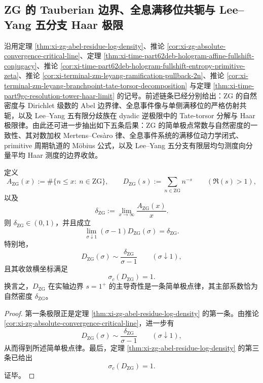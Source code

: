 \subsection{ZG 的 Tauberian 边界、全息满移位共轭与 Lee--Yang 五分支 Haar 极限}\label{subsec:conclusion-zg-hologram-leyang-residue-fullshift-haar}
沿用定理 \ref{thm:xi-zg-abel-residue-log-density}、推论 \ref{cor:xi-zg-absolute-convergence-critical-line}、定理 \ref{thm:xi-time-part62deb-hologram-affine-fullshift-conjugacy}、推论 \ref{cor:xi-time-part62deb-hologram-fullshift-entropy-primitive-zeta}、推论 \ref{cor:xi-terminal-zm-leyang-ramification-pullback-2n}、推论 \ref{cor:xi-terminal-zm-leyang-branchpoint-tate-torsor-decomposition} 与定理 \ref{thm:xi-time-part9gc-resolution-tower-haar-limit} 的记号。前述链条已经分别给出：\(\mathrm{ZG}\) 的自然密度与 Dirichlet 级数的 Abel 边界律、全息事件像与单侧满移位的严格仿射共轭，以及 Lee--Yang 五有限分歧族在 dyadic 逆极限中的 Tate-torsor 分解与 Haar 极限律。由此还可进一步抽出如下五条后果：\(\mathrm{ZG}\) 的简单极点常数与自然密度的一致性、其对数加权 Mertens--Ces\`aro 律、全息事件系统的满移位动力学闭式、primitive 周期轨道的 Möbius 公式，以及 Lee--Yang 五分支有限层均匀测度向分量平均 Haar 测度的边界收敛。

\begin{theorem}[ZG 的 Dirichlet 级数在 \texorpdfstring{$s=1^+$}{s=1+} 的简单极点律，其主部系数等于自然密度]\label{thm:conclusion-zg-dirichlet-simple-pole-density}
定义
\[
A_{\mathrm{ZG}}(x):=\#\{n\le x:\ n\in \mathrm{ZG}\},
\qquad
D_{\mathrm{ZG}}(s):=\sum_{n\in \mathrm{ZG}}n^{-s}
\qquad(\Re(s)>1),
\]
以及
\[
\delta_{\mathrm{ZG}}:=\lim_{x\to\infty}\frac{A_{\mathrm{ZG}}(x)}{x}.
\]
则 \(\delta_{\mathrm{ZG}}\in(0,1)\)，并且成立
\[
\boxed{\;
\lim_{\sigma\downarrow 1}(\sigma-1)D_{\mathrm{ZG}}(\sigma)=\delta_{\mathrm{ZG}}.\;}
\]
特别地，
\[
\boxed{\;
D_{\mathrm{ZG}}(\sigma)\sim \frac{\delta_{\mathrm{ZG}}}{\sigma-1}
\qquad(\sigma\downarrow 1),\;}
\]
且其收敛横坐标满足
\[
\boxed{\;
\sigma_c(D_{\mathrm{ZG}})=1.\;}
\]
换言之，\(D_{\mathrm{ZG}}\) 在实轴边界 \(s=1^+\) 的主导奇性是一条简单极点律，其主部系数恰为自然密度 \(\delta_{\mathrm{ZG}}\)。
\end{theorem}
\begin{proof}
第一条极限正是定理 \ref{thm:xi-zg-abel-residue-log-density} 的第一条。由推论 \ref{cor:xi-zg-absolute-convergence-critical-line}，进一步有
\[
D_{\mathrm{ZG}}(\sigma)\sim \frac{\delta_{\mathrm{ZG}}}{\sigma-1}
\qquad(\sigma\downarrow 1),
\]
从而得到所述简单极点律。最后，定理 \ref{thm:xi-zg-abel-residue-log-density} 的第三条已给出
\[
\sigma_c(D_{\mathrm{ZG}})=1.
\]
证毕。
\end{proof}

